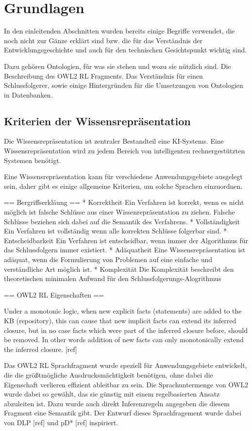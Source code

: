 \chapter{Grundlagen}
In den einleitenden Abschnitten wurden bereits einige Begriffe verwendet, die noch nicht zur Gänze erklärt sind bzw. die für das Verständnis der Entwicklungsgeschichte und auch für den technischen Gesichtspunkt wichtig sind.

Dazu gehören Ontologien, für was sie stehen und wozu sie nützlich sind. Die Beschreibung des OWL2 RL Fragments. Das Verständnis für einen Schlussfolgerer, sowie einige Hintergründen für die Umsetzungen von Ontologien in Datenbanken.

\section{Kriterien der Wissensrepräsentation}

Die Wissensrepräsentation ist zentraler Bestandteil eine KI-Systems. Eine Wissensrepräsentation wird zu jedem Bereich von intelligenten rechnergestützten Systemen benötigt.

Eine Wissensrepräsentation kann für verschiedene Anwendungsgebiete ausgelegt sein, daher gibt es einige allgemeine Kriterien, um solche Sprachen einzuordnen.

== Bergriffserkläung ==
 * Korrektheit
Ein Verfahren ist korrekt, wenn es nicht möglich ist falsche Schlüsse aus einer Wissenrepräsentation zu ziehen. Falsche Schlüsse beziehen sich dabei auf die Semantik des Verfahrens.
 * Vollständigkeit
Ein Verfahren ist vollständig wenn alle korrekten Schlüsse folgerbar sind.
 * Entscheidbarkeit
Ein Verfahren ist entscheidbar, wenn immer der Algorithmus für das Schlussfolgern immer existiert.
 * Adäquatheit
Eine Wissensrepräsentation ist adäquat, wenn die Formulierung von Problemen auf eine einfache und verständliche Art möglich ist.
 * Komplexität
Die Komplexität beschreibt den theoretischen minimalen Aufwand für den Schlussfolgerungs-Alogrithmus


== OWL2 RL Eigenschaften ==

Under a monotonic logic, when new explicit facts (statements) are added to the KB (repository), this can cause that new implicit facts can extend its inferred closure, but in no case facts which were part of the inferred closure before, should be removed. In other words addition of new facts can only monotonically extend the inferred closure. [ref]

Das OWL2 RL Sprachfragment wurde speziell für Anwendungsgebiete entwickelt, die die größtmögliche Ausdrucksmächtigkeit benötigen, ohne dabei die Eigenschaft verlieren effizient ableitbar zu sein. Die Sprachuntermenge von OWL2 wurde dabei so gewählt, das sie günstig mit einem regelbasierten Ansatz abzuleiten ist. Dazu wurde auch direkt Inferenzregeln angegeben die diesem Fragment eine Semantik gibt. Der Entwurf dieses Sprachfragement wurde dabei von DLP [ref] und pD* [ref] inspiriert.

